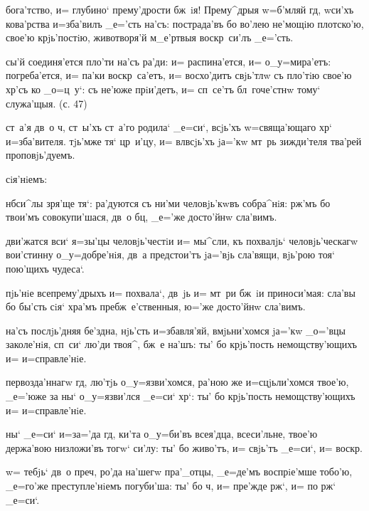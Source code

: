  бога'тство, и= глубино` прему'дрости бж~iя! 
Прему^дрыя w=б'мляй гд, w\т си'хъ кова'рства 
и=зба'вилъ _е='сть на'съ: пострада'въ бо во'лею не'мощiю 
плотско'ю, свое'ю крjь'постiю, животворя'й м_е'ртвыя 
воскр~си'лъ _е='сть.

 сы'й соединя'ется пло'ти на'съ ра'ди: и= 
распина'ется, и= о_у=мира'етъ: погреба'ется, и= па'ки 
воскр~са'етъ, и= восхо'дитъ свjь'тлw съ пло'тiю свое'ю 
хр'съ ко _о=ц~у`: съ не'юже прiи'детъ, и= сп~се'тъ 
бл~гоче'стнw тому` служа'щыя. (с. 47)

  ст~а'я дв~о ч, ст~ы'хъ 
ст~а'го родила` _е=си`, всjь'хъ w=свяща'ющаго хр` 
и=зба'вителя. тjь'мже тя` цр~и'цу, и= вл всjь'хъ 
jа='кw мт~рь зижди'теля тва'рей проповjь'дуемъ.

   сiя'нiемъ:

 нб си^лы зря'ще тя`: ра'дуются съ 
ни'ми человjь'кwвъ собра^нiя: рж'мъ бо твои'мъ 
совокупи'шася, дв~о бц, _е='же досто'йнw сла'вимъ.

 дви'жатся вси` я=зы'цы человjь'честiи и= мы^сли, 
къ похвалjь` человjь'ческагw вои'стинну о_у=добре'нiя, 
дв~а предстои'тъ jа='вjь сла'вящи, вjь'рою тоя` пою'щихъ 
чудеса`.

 пjь'нiе всепрему'дрыхъ и= похвала`, дв~jь 
и= мт~ри бж~iи приноси'мая: сла'вы бо бы'сть сiя` хра'мъ 
пребж~е'ственныя, ю='же досто'йнw сла'вимъ.


  на'съ послjь'дняя бе'здна, нjь'сть 
и=збавля'яй, вмjьни'хомся jа='кw _о='вцы заколе'нiя, 
сп~си` лю'ди твоя^, бж~е на'шъ: ты' бо крjь'пость 
немощству'ющихъ и= и=справле'нiе.

 первозда'ннагw гд, лю'тjь 
о_у=язви'хомся, ра'ною же и=сцjьли'хомся твое'ю, _е='юже 
за ны` о_у=язви'лся _е=си` хр`: ты' бо крjь'пость 
немощству'ющихъ и= и=справле'нiе.

 ны` _е=си` и=з\ъ а='да гд, ки'та 
о_у=би'въ всея'дца, всеси'льне, твое'ю держа'вою 
низложи'въ тогw` си'лу: ты' бо живо'тъ, и= свjь'тъ 
_е=си`, и= воскр.

  w= тебjь` дв~о преч, 
ро'да на'шегw пра'_отцы, _е=де'мъ воспрiе'мше тобо'ю, 
_е=го'же преступле'нiемъ погуби'ша: ты' бо ч, и= 
пре'жде рж`, и= по рж` _е=си`.

